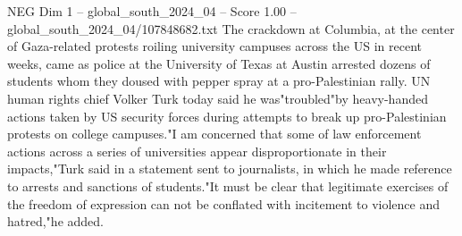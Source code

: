 \begin{textsample}{NEG Dim 1 – global\_south\_2024\_04 – Score 1.00 – global\_south\_2024\_04/107848682.txt}
The crackdown at Columbia, at the center of Gaza-related protests roiling university campuses across the US in recent weeks, came as police at the University of Texas at Austin arrested dozens of students whom they doused with pepper spray at a pro-Palestinian rally.
UN human rights chief Volker Turk today said he was"troubled"by heavy-handed actions taken by US security forces during attempts to break up pro-Palestinian protests on college campuses."I am concerned that some of law enforcement actions across a series of universities appear disproportionate in their impacts,"Turk said in a statement sent to journalists, in which he made reference to arrests and sanctions of students."It must be clear that legitimate exercises of the freedom of expression can not be conflated with incitement to violence and hatred,"he added.

\end{textsample}

